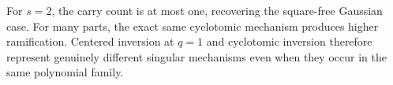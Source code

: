 For \(s=2\), the carry count is at most one, recovering the square-free
Gaussian case.  For many parts, the exact same cyclotomic mechanism produces
higher ramification.  Centered inversion at \(q=1\) and cyclotomic inversion
therefore represent genuinely different singular mechanisms even when they
occur in the same polynomial family.
